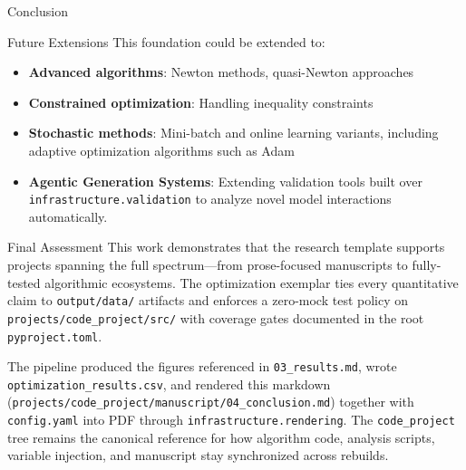 \documentclass[
  ignorenonframetext,
]{beamer}
\providecommand{\tightlist}{%
  \setlength{\itemsep}{0pt}\setlength{\parskip}{0pt}}
\begin{document}
\begin{frame}[fragile]{Conclusion}
\begin{block}{Future Extensions}
\protect{}\label{future-extensions}
This foundation could be extended to:

\begin{itemize}
\tightlist
\item
  \textbf{Advanced algorithms}: Newton methods, quasi-Newton approaches
\item
  \textbf{Constrained optimization}: Handling inequality constraints
\item
  \textbf{Stochastic methods}: Mini-batch and online learning variants,
  including adaptive optimization algorithms such as Adam
  \cite{kingma2014adam}
\item
  \textbf{Agentic Generation Systems}: Extending validation tools built
  over \texttt{infrastructure.validation} to analyze novel model
  interactions automatically.
\end{itemize}
\end{block}

\begin{block}{Final Assessment}
\protect{}\label{final-assessment}
This work demonstrates that the research template supports projects
spanning the full spectrum---from prose-focused manuscripts to
fully-tested algorithmic ecosystems. The optimization exemplar ties
every quantitative claim to \texttt{output/data/} artifacts and enforces
a zero-mock test policy on \texttt{projects/code\_project/src/} with
coverage gates documented in the root \texttt{pyproject.toml}.

The pipeline produced the figures referenced in \texttt{03\_results.md},
wrote \texttt{optimization\_results.csv}, and rendered this markdown
(\texttt{projects/code\_project/manuscript/04\_conclusion.md}) together
with \texttt{config.yaml} into PDF through
\texttt{infrastructure.rendering}. The \texttt{code\_project} tree
remains the canonical reference for how algorithm code, analysis
scripts, variable injection, and manuscript stay synchronized across
rebuilds.
\end{block}
\end{frame}
\end{document}

